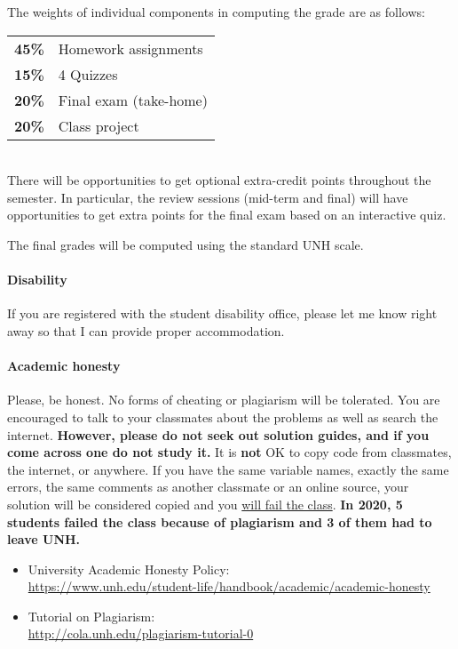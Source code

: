 \documentclass[11pt]{article}
\begin{document}
The weights of individual components in computing the grade are as follows:\\ [2mm]
\begin{tabular}{|r|l|}
	\toprule
	\textbf{45\%} & Homework assignments  \\
	\textbf{15\%} & 4 Quizzes \\
	\textbf{20\%} & Final exam (take-home) \\
	\textbf{20\%} & Class project \\
	\bottomrule
\end{tabular} \\[2mm]

There will be opportunities to get optional extra-credit points throughout the semester. In particular, the review sessions (mid-term and final) will have opportunities to get extra points for the final exam based on an interactive quiz. 

The final grades will be computed using the standard UNH scale.

\paragraph{Disability} If you are registered with the student disability office, please let me know right away so that I can provide proper accommodation.

\paragraph*{Academic honesty} Please, be honest. No forms of cheating or plagiarism will be tolerated. You are encouraged to talk to your classmates about the problems as well as search the internet. \textbf{However, please do not seek out solution guides, and if you come across one do not study it.} It is \textbf{not} OK to copy code from classmates, the internet, or anywhere. If you have the same variable names, exactly the same errors, the same comments as another classmate or an online source, your solution will be considered copied and you \underline{will fail the class}.  \textbf{In 2020, 5 students failed the class because of plagiarism and 3 of them had to leave UNH.}

\begin{itemize}[noitemsep]
	\item University Academic Honesty Policy:\\ \url{https://www.unh.edu/student-life/handbook/academic/academic-honesty}
	\item Tutorial on Plagiarism: \\  \url{http://cola.unh.edu/plagiarism-tutorial-0}
\end{itemize}
\end{document}
